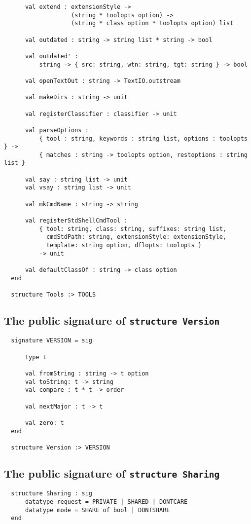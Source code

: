 \begin{small}
\begin{verbatim}
      val extend : extensionStyle ->
                   (string * toolopts option) ->
                   (string * class option * toolopts option) list
  
      val outdated : string -> string list * string -> bool
  
      val outdated' :
          string -> { src: string, wtn: string, tgt: string } -> bool
  
      val openTextOut : string -> TextIO.outstream
  
      val makeDirs : string -> unit
  
      val registerClassifier : classifier -> unit
  
      val parseOptions :
          { tool : string, keywords : string list, options : toolopts } ->
          { matches : string -> toolopts option, restoptions : string list }
  
      val say : string list -> unit
      val vsay : string list -> unit
  
      val mkCmdName : string -> string
  
      val registerStdShellCmdTool :
          { tool: string, class: string, suffixes: string list,
            cmdStdPath: string, extensionStyle: extensionStyle,
            template: string option, dflopts: toolopts }
          -> unit
  
      val defaultClassOf : string -> class option
  end
  
  structure Tools :> TOOLS
\end{verbatim}
\end{small}

\subsection{The public signature of {\tt structure Version}}

\begin{small}
\begin{verbatim}
  signature VERSION = sig
  
      type t
  
      val fromString : string -> t option
      val toString: t -> string
      val compare : t * t -> order
  
      val nextMajor : t -> t
  
      val zero: t
  end
  
  structure Version :> VERSION
\end{verbatim}
\end{small}

\subsection{The public signature of {\tt structure Sharing}}

\begin{small}
\begin{verbatim}
  structure Sharing : sig
      datatype request = PRIVATE | SHARED | DONTCARE
      datatype mode = SHARE of bool | DONTSHARE
  end
\end{verbatim}
\end{small}
